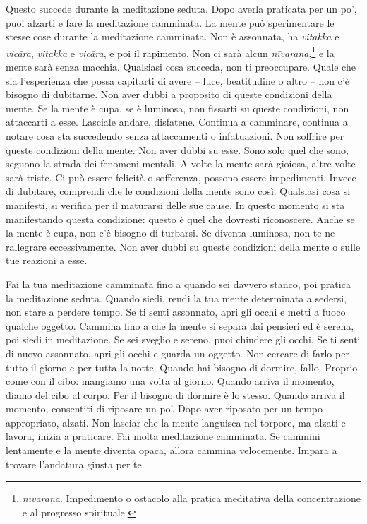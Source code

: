 Questo succede durante la meditazione seduta. Dopo averla praticata per
un po', puoi alzarti e fare la meditazione camminata. La mente può
sperimentare le stesse cose durante la meditazione camminata. Non è
assonnata, ha \emph{vitakka} e \emph{vicāra}, \emph{vitakka} e
\emph{vicāra}, e poi il rapimento. Non ci sarà alcun
\emph{nīvarana},\footnote{\emph{nīvaraṇa}. Impedimento o ostacolo alla
  pratica meditativa della concentrazione e al progresso spirituale.} e
la mente sarà senza macchia. Qualsiasi cosa succeda, non ti preoccupare.
Quale che sia l'esperienza che possa capitarti di avere -- luce,
beatitudine o altro -- non c'è bisogno di dubitarne. Non aver dubbi a
proposito di queste condizioni della mente. Se la mente è cupa, se è
luminosa, non fissarti su queste condizioni, non attaccarti a esse.
Lasciale andare, disfatene. Continua a camminare, continua a notare cosa
sta succedendo senza attaccamenti o infatuazioni. Non soffrire per
queste condizioni della mente. Non aver dubbi su esse. Sono solo quel
che sono, seguono la strada dei fenomeni mentali. A volte la mente sarà
gioiosa, altre volte sarà triste. Ci può essere felicità o sofferenza,
possono essere impedimenti. Invece di dubitare, comprendi che le
condizioni della mente sono così. Qualsiasi cosa si manifesti, si
verifica per il maturarsi delle sue cause. In questo momento si sta
manifestando questa condizione: questo è quel che dovresti riconoscere.
Anche se la mente è cupa, non c'è bisogno di turbarsi. Se diventa
luminosa, non te ne rallegrare eccessivamente. Non aver dubbi su queste
condizioni della mente o sulle tue reazioni a esse.

Fai la tua meditazione camminata fino a quando sei davvero stanco, poi
pratica la meditazione seduta. Quando siedi, rendi la tua mente
determinata a sedersi, non stare a perdere tempo. Se ti senti assonnato,
apri gli occhi e metti a fuoco qualche oggetto. Cammina fino a che la
mente si separa dai pensieri ed è serena, poi siedi in meditazione. Se
sei sveglio e sereno, puoi chiudere gli occhi. Se ti senti di nuovo
assonnato, apri gli occhi e guarda un oggetto. Non cercare di farlo per
tutto il giorno e per tutta la notte. Quando hai bisogno di dormire,
fallo. Proprio come con il cibo: mangiamo una volta al giorno. Quando
arriva il momento, diamo del cibo al corpo. Per il bisogno di dormire è
lo stesso. Quando arriva il momento, consentiti di riposare un po'. Dopo
aver riposato per un tempo appropriato, alzati. Non lasciar che la mente
languisca nel torpore, ma alzati e lavora, inizia a praticare. Fai molta
meditazione camminata. Se cammini lentamente e la mente diventa opaca,
allora cammina velocemente. Impara a trovare l'andatura giusta per te.

